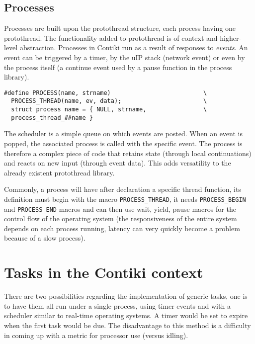 \subsection{Processes}

Processes are built upon the protothread structure, each process having one protothread. The functionality added to protothread is of 
context and higher-level abstraction. Processes in Contiki run as a result of responses to \textit{events}. An event can be triggered
by a timer, by the uIP stack (network event) or even by the process itself (a continue event used by a pause function in the process
library). 

\lstset{numbers=none, mathescape=true, nolol=false,caption=Process definition,label=lst:process}
\begin{lstlisting}
#define PROCESS(name, strname)                          \
  PROCESS_THREAD(name, ev, data);                       \
  struct process name = { NULL, strname,                \
  process_thread_##name }
\end{lstlisting}

The scheduler is a simple queue on which events are posted. When an event is popped, the associated process is called with the specific event.
The process is therefore a complex piece of code that retains state (through local continuations) and reacts on new input (through event data).
This adds versatility to the already existent protothread library.

Commonly, a process will have after declaration a specific thread function, its definition must begin with the macro \texttt{PROCESS\_THREAD},
it needs \texttt{PROCESS\_BEGIN} and \texttt{PROCESS\_END} macros and can then use wait, yield, pause macros for the control flow of the 
operating system (the responsiveness of the entire system depends on each process running, latency can very quickly become a problem because
of a slow process).


\section{Tasks in the Contiki context}
\label{sec:contikitask}
There are two possibilities regarding the implementation of generic tasks, one is to have them
all run under a single process, using timer events and with a scheduler similar to real-time operating
systems. A timer would be set to expire when the first task would be due. The disadvantage to this
method is a difficulty in coming up with a metric for processor use (versus idling).


